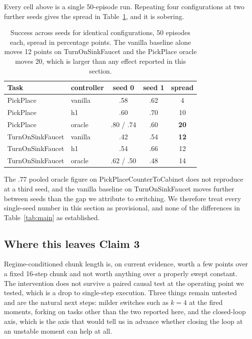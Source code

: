 Every cell above is a single 50-episode run. Repeating four configurations at
two further seeds gives the spread in Table~\ref{tab:seeds}, and it is
sobering.

\begin{table}[t]
\centering
\small
\begin{tabular}{llccc}
\toprule
Task & controller & seed 0 & seed 1 & spread \\
\midrule
PickPlace & vanilla & .58 & .62 & 4 \\
PickPlace & h1 & .60 & .70 & 10 \\
PickPlace & oracle & .80 / .74 & .60 & \textbf{20} \\
TurnOnSinkFaucet & vanilla & .42 & .54 & \textbf{12} \\
TurnOnSinkFaucet & h1 & .54 & .66 & 12 \\
TurnOnSinkFaucet & oracle & .62 / .50 & .48 & 14 \\
\bottomrule
\end{tabular}
\caption{Success across seeds for identical configurations, 50 episodes each,
spread in percentage points. The vanilla baseline alone moves 12 points on
TurnOnSinkFaucet and the PickPlace oracle moves 20, which is larger than any
effect reported in this section.
}
\label{tab:seeds}
\end{table}

The .77 pooled oracle figure on PickPlaceCounterToCabinet does not reproduce
at a third seed, and the vanilla baseline on TurnOnSinkFaucet moves further
between seeds than the gap we attribute to switching. We therefore treat every
single-seed number in this section as provisional, and none of the
differences in Table~\ref{tab:main} as established.

\subsection{Where this leaves Claim 3}

Regime-conditioned chunk length is, on current evidence, worth a few points
over a fixed 16-step chunk and not worth anything over a properly swept
constant. The intervention does not survive a paired causal test at the
operating point we tested, which is a drop to single-step execution. Three
things remain untested and are the natural next steps: milder switches such as
$k{=}4$ at the fired moments, forking on tasks other than the two reported
here, and the closed-loop axis, which is the axis that would tell us in advance
whether closing the loop at an unstable moment can help at all.
